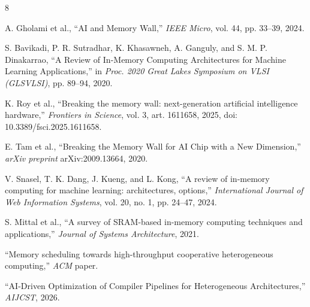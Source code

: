 \documentclass[conference]{IEEEtran}
\begin{document}

\begin{thebibliography}{8}

A. Gholami et al., ``AI and Memory Wall,'' \emph{IEEE Micro}, vol. 44, pp. 33--39, 2024.

S. Bavikadi, P. R. Sutradhar, K. Khasawneh, A. Ganguly, and S. M. P. Dinakarrao,
``A Review of In-Memory Computing Architectures for Machine Learning Applications,''
in \emph{Proc. 2020 Great Lakes Symposium on VLSI (GLSVLSI)}, pp. 89--94, 2020.

K. Roy et al., ``Breaking the memory wall: next-generation artificial intelligence hardware,''
\emph{Frontiers in Science}, vol. 3, art. 1611658, 2025, doi: 10.3389/fsci.2025.1611658.

E. Tam et al., ``Breaking the Memory Wall for AI Chip with a New Dimension,''
\emph{arXiv preprint} arXiv:2009.13664, 2020.

V. Snasel, T. K. Dang, J. Kueng, and L. Kong,
``A review of in-memory computing for machine learning: architectures, options,''
\emph{International Journal of Web Information Systems}, vol. 20, no. 1, pp. 24--47, 2024.

S. Mittal et al.,
``A survey of SRAM-based in-memory computing techniques and applications,''
\emph{Journal of Systems Architecture}, 2021.

``Memory scheduling towards high-throughput cooperative heterogeneous computing,''
\emph{ACM} paper.

``AI-Driven Optimization of Compiler Pipelines for Heterogeneous Architectures,''
\emph{AIJCST}, 2026.

\end{thebibliography}
\end{document}
